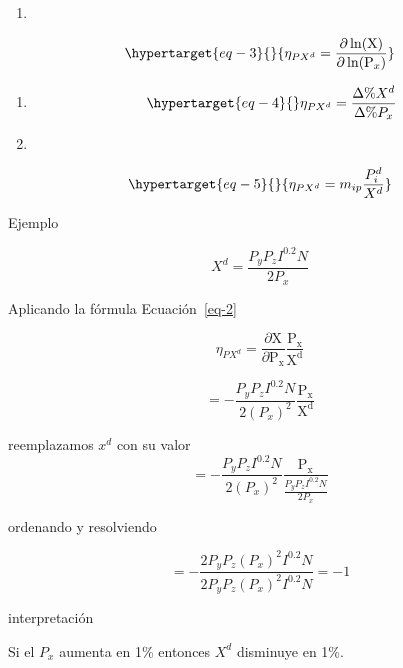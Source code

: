 \documentclass[
  a4paper,
]{article}
\providecommand{\tightlist}{%
  \setlength{\itemsep}{0pt}\setlength{\parskip}{0pt}}\usepackage{longtable,booktabs,array}
\begin{document}
\begin{enumerate}
\def\labelenumi{\arabic{enumi}.}
\setcounter{enumi}{2}
\tightlist
\item
\end{enumerate}

\begin{equation}\protect\hypertarget{eq-3}{}{
\eta _{PX^d} = \frac{\partial \ln(\mathrm X)}{\partial  \ln(\mathrm P_x)}
}\label{eq-3}\end{equation}

\begin{enumerate}
\def\labelenumi{\arabic{enumi}.}
\setcounter{enumi}{3}
\item
  \begin{equation}\protect\hypertarget{eq-4}{}{
  \eta _{PX^d} = \frac{\Delta \% X^d}{\Delta \% P_x}
  }\label{eq-4}\end{equation}
\item
\end{enumerate}

\begin{equation}\protect\hypertarget{eq-5}{}{
\eta_{PX^d} = m_{ip} \frac{P_i^d}{X^d}
}\label{eq-5}\end{equation}

Ejemplo

\[
X^d = \frac{P_y P_z I^{0.2} N}{2 P_x}
\]

Aplicando la fórmula Ecuación~\ref{eq-2}

\[ 
\eta _{PX^d} = \frac{\partial \mathrm{X}}{\partial \mathrm{P_x}} \frac{\mathrm{P_x}}{\mathrm{X^d}} 
\]

\[
= - \frac{P_y P_z I^{0.2} N}{2 (P_x)^2} \frac{\mathrm{P_x}}{\mathrm{X^d} }
\]

reemplazamos \(x^d\) con su valor \[
= - \frac{P_y P_z I^{0.2} N}{2 (P_x)^2} \frac{\mathrm{P_x}}{\frac{P_y P_z I^{0.2} N}{2 P_x} }
\]

ordenando y resolviendo

\[
= - \frac{2 P_y P_z (P_x)^2 I^{0.2} N}{2 P_y P_z (P_x)^2 I^{0.2} N} = -1
\]

interpretación

Si el \(P_x\) aumenta en 1\% entonces \(X^d\) disminuye en 1\%.


\printbibliography
\end{document}
